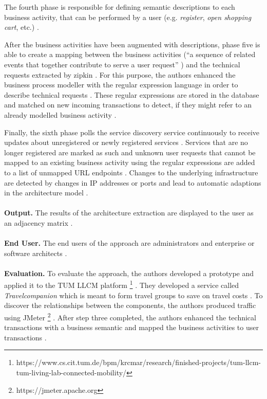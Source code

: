 The fourth phase is responsible for defining semantic descriptions to each business activity, that can be performed by a user (e.g. \textit{register}, \textit{open shopping cart}, etc.) \cite{Kleehaus2018}.

After the business activities have been augmented with descriptions, phase five is able to create a mapping between the business activities (``a sequence of related events that together contribute to serve a user request'' \cite{Kleehaus2018}) and the technical requests extracted by zipkin \cite{Kleehaus2018}.
For this purpose, the authors enhanced the business process modeller with the regular expression language in order to describe technical requests \cite{Kleehaus2018}.
These regular expressions are stored in the database and matched on new incoming transactions to detect, if they might refer to an already modelled business activity \cite{Kleehaus2018}.

Finally, the sixth phase polls the service discovery service continuously to receive updates about unregistered or newly registered services \cite{Kleehaus2018}.
Services that are no longer registered are marked as such and unknown user requests that cannot be mapped to an existing business activity using the regular expressions are added to a list of unmapped URL endpoints \cite{Kleehaus2018}.
Changes to the underlying infrastructure are detected by changes in IP addresses or ports and lead to automatic adaptions in the architecture model \cite{Kleehaus2018}.
\\ \\
\textbf{Output.}
The results of the architecture extraction are displayed to the user as an adjacency matrix \cite{Kleehaus2018}.
\\ \\
\textbf{End User.}
The end users of the approach are administrators and enterprise or software architects \cite{Kleehaus2018}.
\\ \\
\textbf{Evaluation.}
To evaluate the approach, the authors developed a prototype and applied it to the TUM LLCM platform \footnote{https://www.cs.cit.tum.de/bpm/krcmar/research/finished-projects/tum-llcm-tum-living-lab-connected-mobility/} \cite{Kleehaus2018}.
They developed a service called \textit{Travelcompanion} which is meant to form travel groups to save on travel costs \cite{Kleehaus2018}.
To discover the relationships between the components, the authors produced traffic using JMeter \footnote{https://jmeter.apache.org} \cite{Kleehaus2018}.
After step three completed, the authors enhanced the technical transactions with a business semantic and mapped the business activities to user transactions \cite{Kleehaus2018}.

